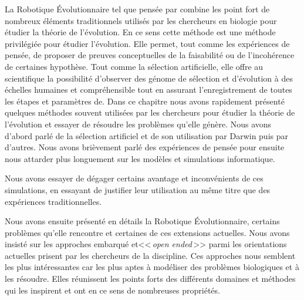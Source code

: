 La Robotique \'Evolutionnaire tel que pensée par \cite{bredeche2012environmentdrivenopenende} combine les point fort de nombreux éléments traditionnels utilisés par les chercheurs en biologie pour étudier la théorie de l'évolution. En ce sens cette méthode est une méthode privilégiée pour étudier l'évolution. Elle permet, tout comme les expériences de pensée, de proposer de preuves conceptuelles de la faisabilité ou de l'incohérence de certaines hypothèse. Tout comme la sélection artificielle, elle offre au scientifique la possibilité d'observer des génome de sélection et d'évolution à des échelles humaines et compréhensible tout en assurant l'enregistrement de toutes les étapes et paramètres de.
Dans ce chapitre nous avons rapidement présenté quelques méthodes souvent utilisées par les chercheurs pour étudier la théorie de l'évolution et essayer de résoudre les problèmes qu'elle génère. Nous avons d'abord parlé de la sélection artificiel et de son utilisation par Darwin puis par d'autres. Nous avons brièvement parlé des expériences de pensée pour ensuite nous attarder plus longuement sur les modèles et simulations informatique.

Nous avons essayer de dégager certains avantage et inconvénients de ces simulations, en essayant de justifier leur utilisation au même titre que des expériences traditionnelles.

Nous avons ensuite présenté en détails la Robotique \'Evolutionnaire, certains problèmes qu'elle rencontre et certaines de ces extensions actuelles. Nous avons insisté sur les approches embarqué et<<\,\emph{open ended}\,>> parmi les orientations actuelles prisent par les chercheurs de la discipline. Ces approches nous semblent les plus intéressantes car les plus aptes à modéliser des problèmes biologiques et à les résoudre. Elles réunissent les points forts des différents domaines et méthodes qui les inspirent et ont en ce sens de nombreuses propriétés. 
